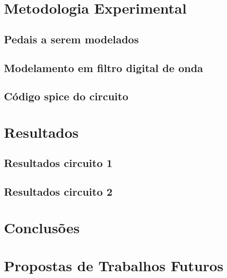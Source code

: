 	\chapter{Metodologia Experimental}
	
	\section{Pedais a serem modelados}
	
	\section{Modelamento em filtro digital de onda}
	
	\section{Código spice do circuito}

	\chapter{Resultados}
	
	\section{Resultados circuito 1}
	
	\section{Resultados circuito 2}
	

	\chapter{Conclusões}

	\chapter{Propostas de Trabalhos Futuros}

